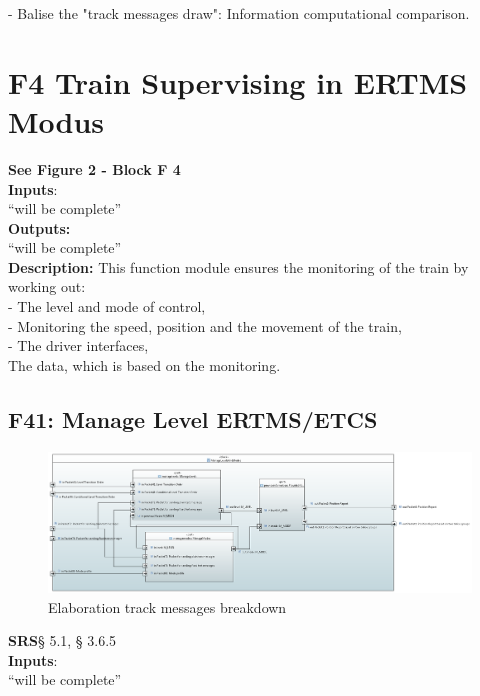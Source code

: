 \documentclass{template/openetcs_report}
\begin{document}
- Balise the "track messages draw": Information computational comparison.\\


 \section{F4 Train Supervising in ERTMS Modus}
 \textbf{See Figure 2 - Block F 4}\\
 
\textbf{Inputs}:\\
``will be complete''\\
 
 \textbf{Outputs:}\\
 ``will be complete''\\
 
 \textbf{Description:} 
 This function module ensures the monitoring of the train by working out: \\
 
 - The level and mode of control,\\
  
- Monitoring the speed, position and the movement of the train,\\
 
- The driver interfaces,\\
 
The data, which is based on the monitoring.\\

 \subsection {F41: Manage Level ERTMS/ETCS}
 
 \begin{figure}[hbtp]
\centering
\includegraphics [scale=0.4] {images/Manage_Level_and_Modes}
\caption{Elaboration track messages breakdown}
\end{figure}
 
 \textbf{SRS}§ 5.1, § 3.6.5 \\
 
 \textbf{Inputs}:\\
``will be complete''\\
 
\end{document}
